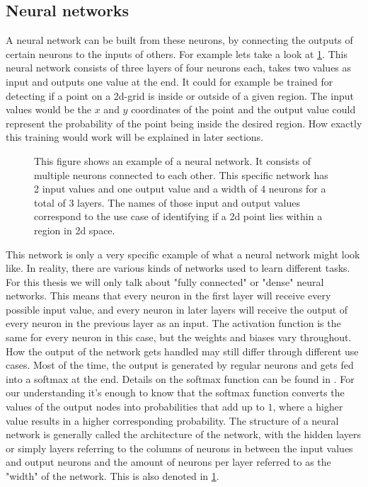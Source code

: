 \subsection{Neural networks}\label{sec:NeuralNetworks}
A neural network can be built from these neurons, by connecting the outputs of certain neurons to the inputs of others. For example lets take a look at \cref{fig:Neural_network_example}. This neural network consists of three layers of four neurons each, takes two values as input and outputs one value at the end. It could for example be trained for detecting if a point on a 2d-grid is inside or outside of a given region. The input values would be the $x$ and $y$ coordinates of the point and the output value could represent the probability of the point being inside the desired region. How exactly this training would work will be explained in later sections. \\
\begin{figure}
	\centering
	
	\caption{This figure shows an example of a neural network. It consists of multiple neurons connected to each other. This specific network has 2 input values and one output value and a width of 4 neurons for a total of 3 layers. The names of those input and output values correspond to the use case of identifying if a 2d point lies within a region in 2d space.}
	\label{fig:Neural_network_example}
\end{figure}
This network is only a very specific example of what a neural network might look like. In reality, there are various kinds of networks used to learn different tasks. For this thesis we will only talk about "fully connected" or "dense" neural networks. This means that every neuron in the first layer will receive every possible input value, and every neuron in later layers will receive the output of every neuron in the previous layer as an input. The activation function is the same for every neuron in this case, but the weights and biases vary throughout. How the output of the network gets handled may still differ through different use cases. Most of the time, the output is generated by regular neurons and gets fed into a softmax at the end. Details on the softmax function can be found in \cite{gao2018properties}. For our understanding it's enough to know that the softmax function converts the values of the output nodes into probabilities that add up to $1$, where a higher value results in a higher corresponding probability. The structure of a neural network is generally called the architecture of the network, with the hidden layers or simply layers referring to the columns of neurons in between the input values and output neurons and the amount of neurons per layer referred to as the "width" of the network. This is also denoted in \cref{fig:Neural_network_example}. 
